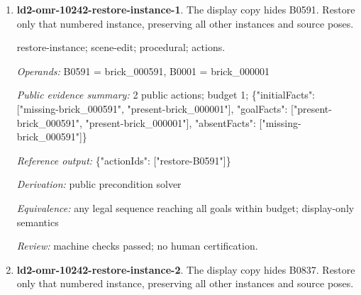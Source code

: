 \begin{enumerate}
\par{\small source-sequence; scene-edit; procedural; actions.\par\textit{Operands:} B0010 = brick\_000010, B0013 = brick\_000013, B0002 = brick\_000002, B0001 = brick\_000001, B0009 = brick\_000009, B0007 = brick\_000007, B0011 = brick\_000011, B0012 = brick\_000012, B0017 = brick\_000017, B0016 = brick\_000016, B0014 = brick\_000014, B0005 = brick\_000005, B0004 = brick\_000004, B0006 = brick\_000006, B0003 = brick\_000003, B0019 = brick\_000019, B0015 = brick\_000015, B0018 = brick\_000018, B0008 = brick\_000008\par\textit{Public evidence summary:} 6 public actions; budget 6; \{"initialFacts": ["start"], "goalFacts": ["done-6"], "absentFacts": []\}\par\textit{Reference output:} \{"actionIds": ["step-1", "step-2", "step-3", "step-4", "step-5", "step-6"]\}\par\textit{Derivation:} public precondition solver\par\textit{Equivalence:} any legal sequence reaching all goals within budget; display-only semantics\par\textit{Review:} pending required human review.}
\item \textbf{ld2-omr-10242-restore-instance-1}. The display copy hides B0591. Restore only that numbered instance, preserving all other instances and source poses.
\par{\small restore-instance; scene-edit; procedural; actions.\par\textit{Operands:} B0591 = brick\_000591, B0001 = brick\_000001\par\textit{Public evidence summary:} 2 public actions; budget 1; \{"initialFacts": ["missing-brick\_000591", "present-brick\_000001"], "goalFacts": ["present-brick\_000591", "present-brick\_000001"], "absentFacts": ["missing-brick\_000591"]\}\par\textit{Reference output:} \{"actionIds": ["restore-B0591"]\}\par\textit{Derivation:} public precondition solver\par\textit{Equivalence:} any legal sequence reaching all goals within budget; display-only semantics\par\textit{Review:} machine checks passed; no human certification.}
\item \textbf{ld2-omr-10242-restore-instance-2}. The display copy hides B0837. Restore only that numbered instance, preserving all other instances and source poses.

\end{enumerate}
